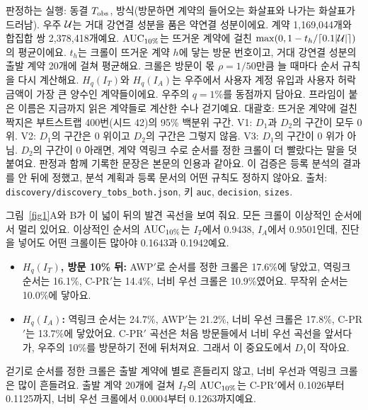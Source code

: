 \begin{table}[!htbp]
\begin{minipage}{\linewidth}\footnotesize\raggedright\vspace{0.4em}
판정하는 실행: 동결 $T_{\mathrm{obs}}$, \both{} 방식(방문하면 계약의 들어오는 화살표와 나가는 화살표가 드러남). 우주 $\mathcal{U}$는 거대 강연결 성분을 품은 약연결 성분이에요. 계약 1,169,044개와 합집합 쌍 2,378,418개예요. $\mathrm{AUC}_{10\%}$는 뜨거운 계약에 걸친 $\max(0,1-t_h/\lceil 0.1|\mathcal{U}|\rceil)$의 평균이에요. $t_h$는 크롤이 뜨거운 계약 $h$에 닿는 방문 번호이고, 거대 강연결 성분의 출발 계약 20개에 걸쳐 평균해요. 크롤은 방문이 몫 $\rho=1/50$만큼 늘 때마다 순서 규칙을 다시 계산해요. $H_q(I_T)$와 $H_q(I_A)$는 우주에서 사용자 계정 유입과 사용자 허락 금액이 가장 큰 양수인 계약들이에요. 우주의 $q=1\%$를 동점까지 담아요. 프라임이 붙은 이름은 지금까지 읽은 계약들로 계산한 수나 걷기예요. 대괄호: 뜨거운 계약에 걸친 짝지은 부트스트랩 400번(시드 42)의 95\% 백분위 구간. V1: $D_1$과 $D_2$의 구간이 모두 0 위. V2: $D_1$의 구간은 0 위이고 $D_2$의 구간은 그렇지 않음. V3: $D_1$의 구간이 0 위가 아님. $D_2$의 구간이 0 아래면, 계약 역링크 수로 순서를 정한 크롤이 더 빨랐다는 말을 덧붙여요. 판정과 함께 기록한 문장은 본문의 인용과 같아요. 이 검증은 등록 분석의 결과를 안 뒤에 정했고, 분석 계획과 등록 문서의 어떤 규칙도 정하지 않아요. 출처: \texttt{discovery/discovery\_tobs\_both.json}, 키 \texttt{auc}, \texttt{decision}, \texttt{sizes}.
\end{minipage}
\end{table}

그림~\ref{fig1}A와 B가 이 넓이 뒤의 발견 곡선을 보여 줘요. 모든 크롤이 이상적인 순서에서 멀리 있어요. 이상적인 순서의 $\mathrm{AUC}_{10\%}$는 $I_T$에서 0.9438, $I_A$에서 0.9501인데, 진단을 넣어도 어떤 크롤이든 많아야 0.1643과 0.1942예요.
\begin{itemize}
\item \textbf{$H_q(I_T)$, 방문 10\% 뒤:} AWP$'$로 순서를 정한 크롤은 17.6\%에 닿았고, 역링크 순서는 16.1\%, C-PR$'$는 14.4\%, 너비 우선 크롤은 10.9\%였어요. 무작위 순서는 10.0\%에 닿아요.
\item \textbf{$H_q(I_A)$:} 역링크 순서는 24.7\%, AWP$'$는 21.2\%, 너비 우선 크롤은 17.8\%, C-PR$'$는 13.7\%에 닿았어요. C-PR$'$ 곡선은 처음 방문들에서 너비 우선 곡선을 앞서다가, 우주의 10\%를 방문하기 전에 뒤처져요. 그래서 이 중요도에서 $D_1$이 작아요.
\end{itemize}
걷기로 순서를 정한 크롤은 출발 계약에 별로 흔들리지 않고, 너비 우선과 역링크 크롤은 많이 흔들려요. 출발 계약 20개에 걸쳐 $I_T$의 $\mathrm{AUC}_{10\%}$는 C-PR$'$에서 0.1026부터 0.1125까지, 너비 우선 크롤에서 0.0004부터 0.1263까지예요.


